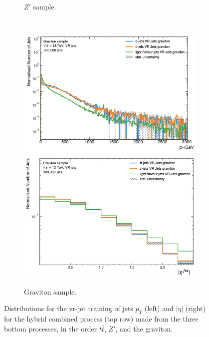 \begin{figure}[h!]
\begin{subfigure}[b]{0.98\textwidth}
      \caption{$Z'$ sample.} 
      \label{fig:vrjetdiszp}
  \end{subfigure}\\
  \begin{subfigure}[b]{0.98\textwidth}
      \centering
      \includegraphics[scale=0.45]{Images/FTAG/VRDips/JetDist/grpt.png}
      \includegraphics[scale=0.45]{Images/FTAG/VRDips/JetDist/greta.png}
      \caption{Graviton sample.} 
      \label{fig:vrjetdisgr}
  \end{subfigure}
  \caption{Distributions for the \gls{vr}-jet training of jets $p_T$ (left) and $|\eta|$ (right) for the hybrid combined process (top row) made from the three bottom processes, in the order $t\bar{t}$, $Z'$, and the graviton.}
  \label{fig:vrjetdist}
\end{figure} 
 
